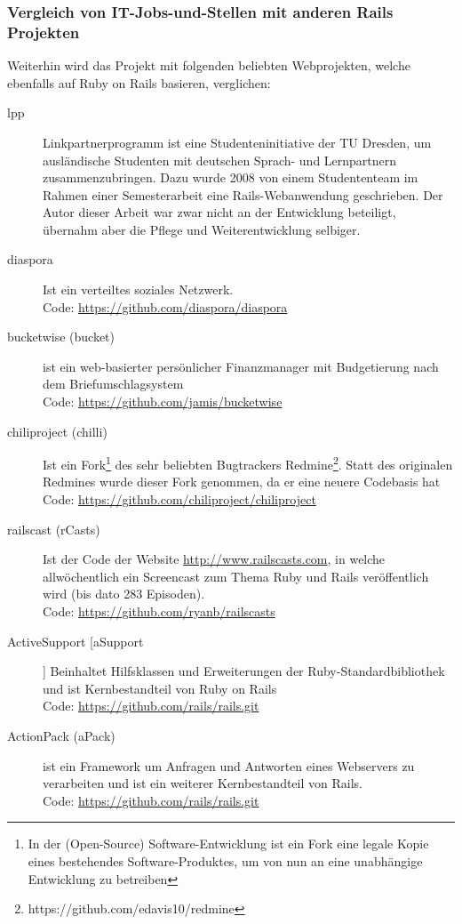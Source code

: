 \subsubsection{Vergleich von IT-Jobs-und-Stellen mit anderen Rails Projekten}
Weiterhin wird das Projekt mit folgenden beliebten Webprojekten, welche ebenfalls auf Ruby on Rails basieren, verglichen:
\begin{description}
\item[lpp] Linkpartnerprogramm ist eine Studenteninitiative der TU Dresden, um ausländische Studenten mit deutschen Sprach- und Lernpartnern zusammenzubringen. Dazu wurde 2008 von einem Studententeam im Rahmen einer Semesterarbeit eine Rails-Webanwendung geschrieben. Der Autor dieser Arbeit war zwar nicht an der Entwicklung beteiligt, übernahm aber die Pflege und Weiterentwicklung selbiger.
 \item[diaspora] Ist ein verteiltes soziales Netzwerk. \\
 Code: \url{https://github.com/diaspora/diaspora}
 \item[bucketwise (bucket)] ist ein web-basierter persönlicher Finanzmanager mit Budgetierung nach dem Briefumschlagsystem\\
 Code: \url{https://github.com/jamis/bucketwise}
 \item[chiliproject (chilli)] Ist ein Fork\footnote{In der (Open-Source) Software-Entwicklung ist ein Fork eine legale Kopie eines bestehendes Software-Produktes, um von nun an eine unabhängige Entwicklung zu betreiben} des sehr beliebten Bugtrackers Redmine\footnote{https://github.com/edavis10/redmine}. Statt des originalen Redmines wurde dieser Fork genommen, da er eine neuere Codebasis hat\\
 Code: \url{https://github.com/chiliproject/chiliproject}
 \item[railscast (rCasts)] Ist der Code der Website \url{http://www.railscasts.com}, in welche allwöchentlich ein Screencast zum Thema Ruby und Rails veröffentlich wird (bis dato 283 Episoden).\\
 Code: \url{https://github.com/ryanb/railscasts} 
 \item[ActiveSupport [aSupport]] Beinhaltet Hilfsklassen und Erweiterungen der Ruby-Standardbibliothek und ist Kernbestandteil von Ruby on Rails \\
 Code: \url{https://github.com/rails/rails.git}
 \item[ActionPack (aPack)]  ist ein Framework um Anfragen und Antworten eines Webservers zu verarbeiten und ist ein weiterer Kernbestandteil von Rails.\\
 Code: \url{https://github.com/rails/rails.git}
\end{description}

